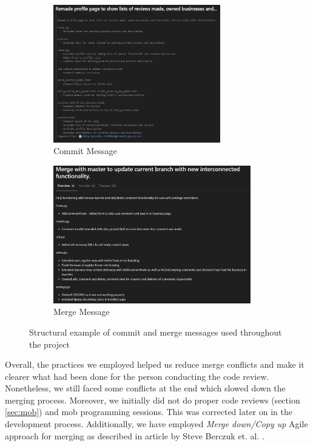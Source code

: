 \documentclass{l3proj}
\begin{document}
        \begin{figure}[H]
            \begin{subfigure}{0.5\textwidth}
                \includegraphics[width=0.9\linewidth, height=6cm]{images/CommitSnippet.PNG}
                \caption{Commit Message}
                \label{fig:commit_msg}
            \end{subfigure}
            \begin{subfigure}{0.5\textwidth}
                \includegraphics[width=0.9\linewidth, height=6cm]{images/MergerSnippet.PNG}
                \caption{Merge Message}
                \label{fig:merge_msg}
            \end{subfigure}
            
            \caption{Structural example of commit and merge messages used throughout the project}
            \label{fig:image2}
        \end{figure}
        Overall, the practices we employed helped us reduce merge conflicts and make it clearer what had been done for the person conducting the code review. Nonetheless, we still faced some conflicts at the end which slowed down the merging process. Moreover, we initially did not do proper code reviews (section \ref{sec:mob}) and mob programming sessions. This was corrected later on in the development process. Additionally, we have employed \textit{Merge down/Copy up} Agile approach for merging as described in article by Steve Berczuk et. al. \cite{merge}.
\end{document}
